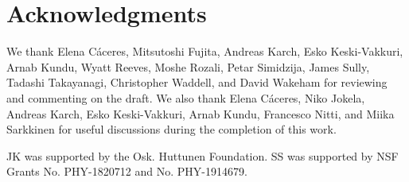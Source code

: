 \documentclass[reprint,amsmath,amssymb,aps,nofootinbib,twocolumn]{revtex4-2}
\begin{document}
\section*{Acknowledgments}

We thank Elena C\'aceres, Mitsutoshi Fujita, Andreas Karch, Esko Keski-Vakkuri, Arnab Kundu, Wyatt Reeves, Moshe Rozali, Petar Simidzija, James Sully, Tadashi Takayanagi, Christopher Waddell, and David Wakeham for reviewing and commenting on the draft. We also thank Elena C\'aceres, Niko Jokela, Andreas Karch, Esko Keski-Vakkuri, Arnab Kundu, Francesco Nitti, and Miika Sarkkinen for useful discussions during the completion of this work.

JK was supported by the Osk. Huttunen Foundation. SS was supported by NSF Grants No. PHY-1820712 and No. PHY-1914679.
\end{document}

